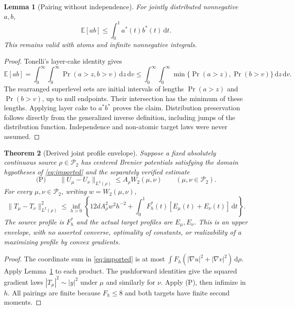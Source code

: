 \documentclass[11pt]{article}
\newtheorem{theorem}{Theorem}[section]
\newtheorem{lemma}[theorem]{Lemma}
\theoremstyle{remark}\newtheorem{remark}[theorem]{Remark}
\newcommand{\dd}{\,\mathrm d}
\newcommand{\norm}[1]{\lVert#1\rVert}
\newcommand{\Ptwo}{\mathcal P_2}
\begin{document}
\begin{lemma}[Pairing without independence]\label{lem:pair}
For jointly distributed nonnegative $a,b$,
\[
 \mathbb E[ab]\le\int_0^1a^*(t)b^*(t)\dd t.
\]
This remains valid with atoms and infinite nonnegative integrals.
\end{lemma}
\begin{proof}
Tonelli's layer-cake identity gives
\[
 \mathbb E[ab]=\int_0^\infty\!\int_0^\infty
        \Pr(a>z,b>v)\dd z\dd v
 \le\int_0^\infty\!\int_0^\infty
        \min\{\Pr(a>z),\Pr(b>v)\}\dd z\dd v.
\]
The rearranged superlevel sets are initial intervals of lengths $\Pr(a>z)$ and $\Pr(b>v)$, up to null endpoints. Their intersection has the minimum of these lengths. Applying layer cake to $a^*b^*$ proves the claim. Distribution preservation follows directly from the generalized inverse definition, including jumps of the distribution function. Independence and non-atomic target laws were never assumed.
\end{proof}

\begin{theorem}[Derived joint profile envelope]\label{thm:envelope}
Suppose a fixed absolutely continuous source $\rho\in\Ptwo$ has centered Brenier potentials satisfying the domain hypotheses of \eqref{eq:imported} and the separately verified estimate
\begin{equation}\label{eq:P}
 \text{(P)}\qquad\norm{U_\mu-U_\nu}_{L^2(\rho)}\le A_\rho W_2(\mu,\nu)
 \qquad(\mu,\nu\in\Ptwo).
\end{equation}
For every $\mu,\nu\in\Ptwo$, writing $w=W_2(\mu,\nu)$,
\begin{equation}\label{eq:envelope}
 \norm{T_\mu-T_\nu}_{L^2(\rho)}^2
 \le\inf_{h>0}\left\{12dA_\rho^2w^2h^{-2}+
       \int_0^1 F_h^*(t)[E_\mu(t)+E_\nu(t)]\dd t\right\}.
\end{equation}
The source profile is $F_h^*$ and the actual target profiles are $E_\mu,E_\nu$. This is an upper envelope, with no asserted converse, optimality of constants, or realizability of a maximizing profile by convex gradients.
\end{theorem}
\begin{proof}
The coordinate sum in \eqref{eq:imported} is at most
$\int F_h(|\nabla u|^2+|\nabla v|^2)\dd\rho$.
Apply Lemma~\ref{lem:pair} to each product. The pushforward identities give the squared gradient laws $|T_\mu|^2\sim |y|^2$ under $\mu$ and similarly for $\nu$. Apply (P), then infimize in $h$. All pairings are finite because $F_h\le8$ and both targets have finite second moments.
\end{proof}
\end{document}

